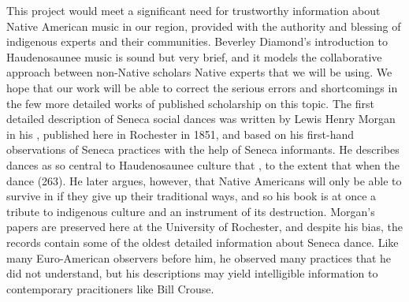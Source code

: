 \documentclass[12pt]{article}
\begin{document}
This project would meet a significant need for trustworthy information about
Native American music in our region, provided with the authority and blessing
of indigenous experts and their communities.
Beverley Diamond's introduction to Haudenosaunee music is sound but very
brief, and it models the collaborative approach between non-Native scholars
Native experts that we will be using.%
\Autocite{Diamond:NativeAmericanNortheast}
We hope that our work will be able to correct the serious errors and
shortcomings in the few more detailed works of published scholarship on this
topic.
The first detailed description of Seneca social dances was written by Lewis
Henry Morgan in his ,
published here in Rochester in 1851, and based on his first-hand observations
of Seneca practices with the help of Seneca informants.%
\Autocite{Morgan:League}
He describes dances as so central to Haudenosaunee culture that , to the
extent that when the dance  (263).%
\Autocite[261, 263]{Morgan:League}
He later argues, however, that Native Americans will only be able to survive
in  if they give up their traditional ways, and so his
book is at once a tribute to indigenous culture and an instrument of its
destruction.
Morgan's papers are preserved here at the University of Rochester, and despite
his bias, the records contain some of the oldest detailed information about
Seneca dance.
Like many Euro-American observers before him, he observed many practices that
he did not understand, but his descriptions may yield intelligible information
to contemporary pracitioners like Bill Crouse.
\end{document}
